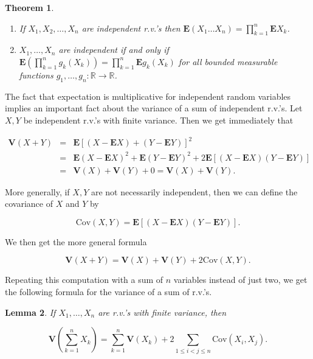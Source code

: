 \documentclass[11pt]{report}
\newcommand{\R}{\mathbb{R}}
\theoremstyle{plain}
\newtheorem{thm}{Theorem}[chapter]
\newtheorem{lem}[thm]{Lemma}
\theoremstyle{definition}
\begin{document}
\begin{thm}

\begin{enumerate}[label=(\roman*)]
\item If $X_1,X_2,\ldots,X_n$ are independent r.v.'s then
$\mathbf{E}(X_1 \ldots X_n) = \prod_{k=1}^n
\mathbf{E} X_k$.

\item $X_1,\ldots,X_n$ are independent if and only if
$\mathbf{E}\left(\prod_{k=1}^n g_k(X_k)\right) =
\prod_{k=1}^n \mathbf{E} g_k(X_k)$
for all bounded measurable functions
$g_1,\ldots,g_n:\R\to\R$.
\end{enumerate}

\end{thm}

The fact that expectation is multiplicative for
independent random variables implies an important fact
about the variance of a sum of independent r.v.'s. Let
$X,Y$ be independent r.v.'s with finite variance.
Then we get immediately that

\begin{eqnarray*}
\mathbf{V}(X+Y) &=& \mathbf{E}\left[(X-\mathbf{E} X)+(Y-\mathbf{E} Y)\right]^2 \\ &=&
\mathbf{E}(X-\mathbf{E} X)^2 + \mathbf{E}(Y-\mathbf{E} Y)^2 +2 \mathbf{E}\left[ (X-\mathbf{E} X)(Y-\mathbf{E} Y)\right] \\
&=& \mathbf{V}(X)+\mathbf{V}(Y) + 0 = \mathbf{V}(X)+\mathbf{V}(Y).
\end{eqnarray*}

More generally, if $X,Y$ are not necessarily
independent, then we can define the covariance of $X$
and $Y$ by

\[
\textrm{Cov}(X,Y) = \mathbf{E}\left[ (X-\mathbf{E} X)(Y-\mathbf{E} Y)\right].
\]

We then get the more general formula

\[
\mathbf{V}(X+Y) = \mathbf{V}(X) + \mathbf{V}(Y) + 2 \textrm{Cov}(X,Y).
\]

Repeating this computation with a sum of $n$
variables instead of just two, we get the following
formula for the variance of a sum of r.v.'s.

\begin{lem}
If $X_1,\ldots,X_n$ are r.v.'s with finite variance,
then

\[
\mathbf{V}\left(\sum_{k=1}^n X_k\right) = \sum_{k=1}^n \mathbf{V}(X_k) + 2 \sum_{1\le i<j\le n} \textrm{Cov}(X_i,X_j).
\]

\end{lem}
\end{document}
